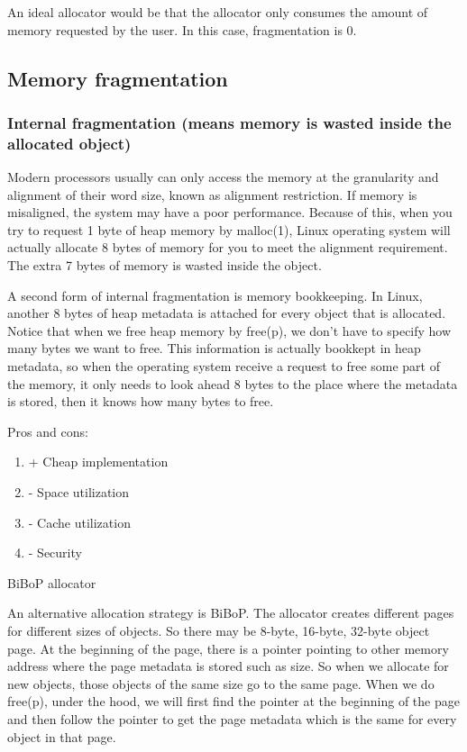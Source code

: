 \documentclass[twoside]{article}
\begin{document}
An ideal allocator would be that the allocator only consumes the amount of memory requested by the user. In this case, fragmentation is 0.

\subsection{Memory fragmentation}

\subsubsection{Internal fragmentation (means memory is wasted inside the allocated object)}

Modern processors usually can only access the memory at the granularity and alignment of their word size, known as alignment restriction. If memory is misaligned, the system may have a poor performance. Because of this, when you try to request 1 byte of heap memory by malloc(1), Linux operating system will actually allocate 8 bytes of memory for you to meet the alignment requirement. The extra 7 bytes of memory is wasted inside the object.

A second form of internal fragmentation is memory bookkeeping. In Linux, another 8 bytes of heap metadata is attached for every object that is allocated. Notice that when we free heap memory by free(p), we don’t have to specify how many bytes we want to free. This information is actually bookkept in heap metadata, so when the operating system receive a request to free some part of the memory, it only needs to look ahead 8 bytes to the place where the metadata is stored, then it knows how many bytes to free.

Pros and cons:

\begin{enumerate}
\item + Cheap implementation
\item - Space utilization
\item - Cache utilization
\item - Security
\end{enumerate}

BiBoP allocator

An alternative allocation strategy is BiBoP. The allocator creates different pages for different sizes of objects. So there may be 8-byte, 16-byte, 32-byte object page. At the beginning of the page, there is a pointer pointing to other memory address where the page metadata is stored such as size. So when we allocate for new objects, those objects of the same size go to the same page. When we do free(p), under the hood, we will first find the pointer at the beginning of the page and then follow the pointer to get the page metadata which is the same for every object in that page.
\end{document}
